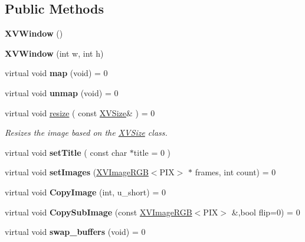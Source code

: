\subsection*{Public Methods}
\begin{CompactItemize}
\item 
{\bf XVWindow} ()
\item 
{\bf XVWindow} (int w, int h)
\item 
\label{XVWindow_a2}
\hypertarget{class_XVWindow_a2}{
virtual void {\bf map} (void) = 0}

\item 
\label{XVWindow_a3}
\hypertarget{class_XVWindow_a3}{
virtual void {\bf unmap} (void) = 0}

\item 
virtual void \hyperlink{class_XVWindow_a4}{resize} ( const \hyperlink{class_XVSize}{XVSize}\& ) = 0
\begin{CompactList}\small\item\em Resizes the image based on the \hyperlink{class_XVSize}{XVSize} class.\item\end{CompactList}\item 
virtual void {\bf set\-Title} ( const char $\ast$title = 0 )
\item 
\label{XVWindow_a6}
\hypertarget{class_XVWindow_a6}{
virtual void {\bf set\-Images} (\hyperlink{class_XVImageRGB}{XVImage\-RGB}$<$PIX$>$ $\ast$ frames, int count) = 0}

\item 
\label{XVWindow_a7}
\hypertarget{class_XVWindow_a7}{
virtual void {\bf Copy\-Image} (int, u\_\-short) = 0}

\item 
\label{XVWindow_a8}
\hypertarget{class_XVWindow_a8}{
virtual void {\bf Copy\-Sub\-Image} (const \hyperlink{class_XVImageRGB}{XVImage\-RGB}$<$PIX$>$ \&,bool flip=0) = 0}

\item 
\label{XVWindow_a9}
\hypertarget{class_XVWindow_a9}{
virtual void {\bf swap\_\-buffers} (void) = 0}


\end{CompactItemize}
